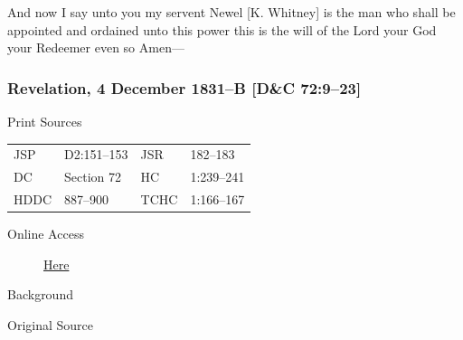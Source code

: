 {				And now I say unto you my servent Newel [K. Whitney] is the man who shall be appointed and ordained unto this power this is the will of the Lord your God your Redeemer even so Amen---
				
		\subsubsection{Revelation, 4 December 1831--B [D\&C 72:9--23]}
			\label{EMS-1831-JS-4-DEC-1831-B}
		
			\begin{description}
				\item[Print Sources]
			\end{description}

				\begin{tabular}{p{0.5in}p{1in}p{0.5in}p{1in}}
				JSP	 	& D2:151--153	& JSR 		& 182--183 \\
				DC	 	& Section 72 	& HC 		& 1:239--241 \\
				HDDC 	& 887--900		& TCHC 		& 1:166--167 \\
				\end{tabular}
			
			\begin{description}
				\item[Online Access] \href{https://www.josephsmithpapers.org/paper-summary/revelation-4-december-1831-b-dc-729-23/1}{Here}
			\end{description}
			
			\begin{description}
				\item[Background]
			\end{description}
			
			
			\begin{description}
				\item[Original Source]
			\end{description}
			
			
}
